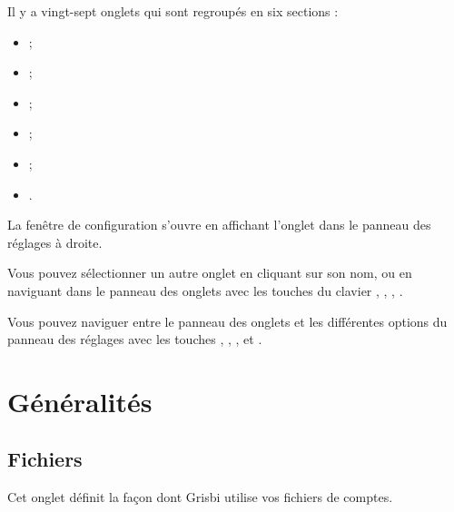 Il y a vingt-sept onglets qui sont regroupés en six sections :
\begin{itemize}
	\item {} ;
	\item {} ;
	\item {} ;
	\item {} ;
	\item {} ;
	\item {}.
\end{itemize}

La fenêtre de configuration s'ouvre en affichant l'onglet  dans le panneau des réglages à droite.

Vous pouvez sélectionner un autre onglet en cliquant sur son nom, ou en naviguant dans le panneau des onglets avec les touches du clavier   , , , .

Vous pouvez naviguer entre le panneau des onglets et les différentes options du panneau des réglages avec les touches , , ,  et .


\section{Généralités\label{setup-general}}


\subsection{Fichiers\label{setup-general-files}}

Cet onglet définit la façon dont Grisbi utilise vos fichiers \ifIllustration de comptes.

